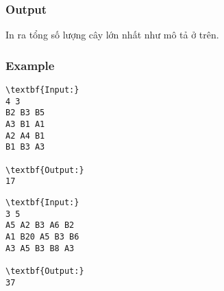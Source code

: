 \subsubsection{   Output  }

   In ra tổng số lượng cây lớn nhất như mô tả ở trên.  

\subsubsection{   Example  }
\begin{verbatim}
\textbf{Input:}
4 3
B2 B3 B5
A3 B1 A1
A2 A4 B1
B1 B3 A3

\textbf{Output:}
17
\end{verbatim}
\begin{verbatim}
\textbf{Input:}
3 5
A5 A2 B3 A6 B2
A1 B20 A5 B3 B6
A3 A5 B3 B8 A3

\textbf{Output:}
37\end{verbatim}